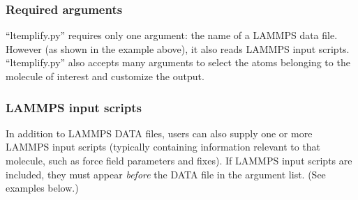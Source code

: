 \documentclass[11pt]{article}
\begin{document}
\subsubsection*{Required arguments}

``ltemplify.py'' requires only one argument: the name of a LAMMPS data file.
However (as shown in the example above), it also reads LAMMPS input scripts.
``ltemplify.py'' also accepts many arguments to select the atoms belonging
to the molecule of interest and customize the output.

\subsubsection*{LAMMPS input scripts}

In addition to LAMMPS DATA files, users can also supply
one or more LAMMPS input scripts
(typically containing information relevant to that molecule,
such as force field parameters and fixes).
If LAMMPS input scripts are included, they must appear \textit{before}
the DATA file in the argument list. (See examples below.)

\pagebreak
\end{document}
